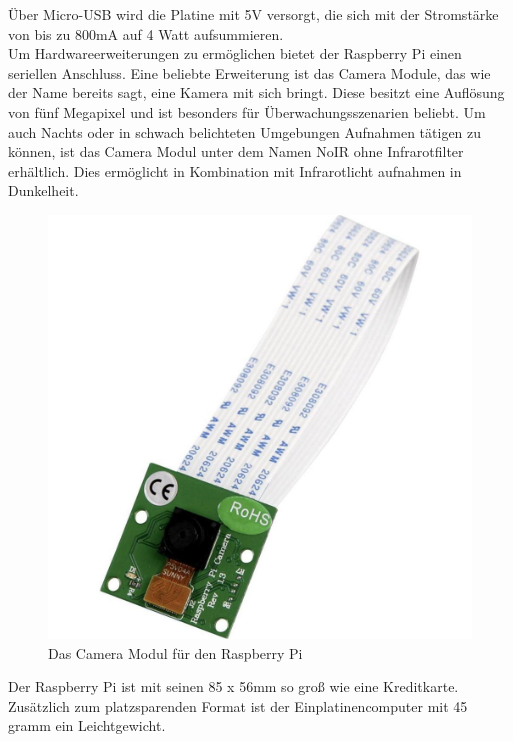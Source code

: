 Über Micro-\ac{USB} wird die Platine mit 5V versorgt, die sich mit der Stromstärke von bis zu 800mA auf 4 Watt aufsummieren. \\

Um Hardwareerweiterungen zu ermöglichen bietet der Raspberry Pi einen seriellen Anschluss. Eine beliebte Erweiterung ist das Camera Module, das wie der Name bereits sagt, eine Kamera mit sich bringt. Diese besitzt eine Auflösung von fünf Megapixel und ist besonders für Überwachungsszenarien beliebt. Um auch Nachts oder in schwach belichteten Umgebungen Aufnahmen tätigen zu können, ist das Camera Modul unter dem Namen NoIR ohne Infrarotfilter erhältlich. Dies ermöglicht in Kombination mit Infrarotlicht aufnahmen in Dunkelheit.

\begin{figure}[H] 
	\centering
	\includegraphics[scale=0.2]{Bilder/cameramodul}
	\caption{Das Camera Modul für den Raspberry Pi\cite{i:camera}}
	\label{f:camera}
\end{figure}

Der Raspberry Pi ist mit seinen 85 x 56mm so groß wie eine Kreditkarte. Zusätzlich zum platzsparenden Format ist der Einplatinencomputer mit 45 gramm ein Leichtgewicht.